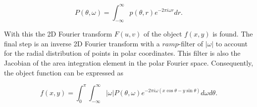 \begin{equation}\label{eq:FBP_1}
    P(\theta, \omega) = \int_{-\infty}^{\infty} p(\theta,r)e^{-2\pi i\omega r} dr.
\end{equation}

With this the 2D Fourier transform $F(u,v)$ of the object $f(x,y)$ is found. The final step is an inverse 2D Fourier transform with a $ramp$-filter of $|\omega|$ to account for the radial distribution of points in polar coordinates. This filter is also the Jacobian of the area integration element in the polar Fourier space. Consequently, the object function can be expressed as

\begin{equation}
    f(x,y) = \int_{0}^{\pi} \int_{-\infty}^{\infty} \left|\omega\right| P(\theta,\omega)e^{-2\pi i\omega (x\cos\theta - y\sin\theta)} d\omega d\theta.
\end{equation}







